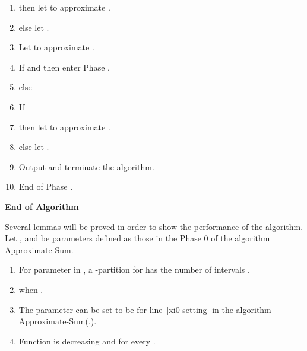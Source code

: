 \documentclass[runningheads]{llncs}
\newcommand{\scrod}{\quad\nopagebreak}
\begin{document}
\begin{enumerate}[1.]
\item\label{assign-hat-C}
\qquad\qquad then let  to
approximate .

\item\label{I-j-loop-end}
\qquad\qquad else let .



\item\label{loop-m-end}
\qquad Let  to
approximate .

\item\label{until-condition}
\qquad If  and  then
enter Phase .

\item
\qquad else

\item
\qquad\qquad If 

\item
\qquad\qquad then let 
to approximate .

\item
\qquad\qquad else let .


\item
\qquad\qquad Output  and terminate the algorithm.

\item
End of Phase .
\end{enumerate}


{\bf End of Algorithm}

\vskip 10pt

Several lemmas will be proved in order to show the performance of
the algorithm.  Let , and  be parameters
defined as those in the Phase 0 of the algorithm
Approximate-Sum.




\begin{lemma}\label{prelimary-lemma}\scrod
\begin{enumerate}
\item\label{k-bound}
For parameter  in , a -partition for
 has the number of intervals .

\item\label{g(x)-bound}
 when .

\item\label{x0-bound} The parameter
 can be set to be 
for line~\ref{xi0-setting} in the algorithm Approximate-Sum(.).

\item\label{g(x)-decreasing}
Function  is decreasing and  for every .
\end{enumerate}
\end{lemma}
\end{document}
